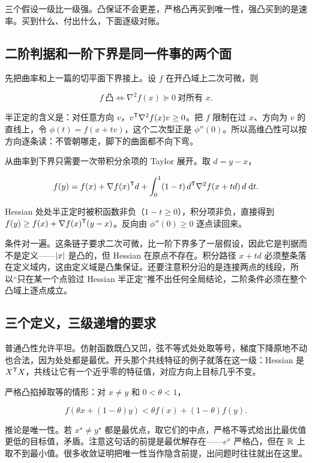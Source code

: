 三个假设一级比一级强。凸保证不会更差，严格凸再买到唯一性，强凸买到的是速率。买到什么、付出什么，下面逐级对账。

\subsection{二阶判据和一阶下界是同一件事的两个面}

先把曲率和上一篇的切平面下界接上。设 \(f\) 在开凸域上二次可微，则

\[
f\ \text{凸}
\iff
\nabla^2f(x)\succeq0\ \text{对所有 }x.
\]

半正定的含义是：对任意方向 \(v\)，\(v^{\mathsf{T}}\nabla^2f(x)v\ge0\)。把 \(f\) 限制在过 \(x\)、方向为 \(v\) 的直线上，令 \(\phi(t)=f(x+tv)\)，这个二次型正是 \(\phi''(0)\)。所以高维凸性可以按方向逐条读：不管朝哪走，脚下的曲面都不向下弯。

从曲率到下界只需要一次带积分余项的 Taylor 展开。取 \(d=y-x\)，

\[
f(y)=f(x)+\nabla f(x)^{\mathsf{T}}d+\int_0^1(1-t)\,d^{\mathsf{T}}\nabla^2f(x+td)\,d\;\mathrm{d}t.
\]

Hessian 处处半正定时被积函数非负（\(1-t\ge0\)），积分项非负，直接得到 \(f(y)\ge f(x)+\nabla f(x)^{\mathsf{T}}(y-x)\)。反向由 \(\phi''(0)\ge0\) 逐点读回来。

条件对一遍。这条链子要求二次可微，比一阶下界多了一层假设，因此它是判据而不是定义——\(\left|x\right|\) 是凸的，但 Hessian 在原点不存在。积分路径 \(x+td\) 必须整条落在定义域内，这由定义域是凸集保证。还要注意积分沿的是连接两点的线段，所以``只在某一个点验过 Hessian 半正定''推不出任何全局结论，二阶条件必须在整个凸域上逐点成立。

\subsection{三个定义，三级递增的要求}

普通凸性允许平坦。仿射函数既凸又凹，弦不等式处处取等号，梯度下降原地不动也合法，因为处处都是最优。开头那个共线特征的例子就落在这一级：Hessian 是 \(X^{\mathsf{T}}X\)，共线让它有一个近乎零的特征值，对应方向上目标几乎不变。

严格凸掐掉取等的情形：对 \(x\ne y\) 和 \(0<\theta<1\)，

\[
f(\theta x+(1-\theta)y)<\theta f(x)+(1-\theta)f(y).
\]

推论是唯一性。若 \(x^\star\ne y^\star\) 都是最优点，取它们的中点，严格不等式给出比最优值更低的目标值，矛盾。注意这句话的前提是最优解存在——\(e^x\) 严格凸，但在 \(\mathbb{R}\) 上取不到最小值。很多收敛证明把唯一性当作隐含前提，出问题时往往就出在这里。

